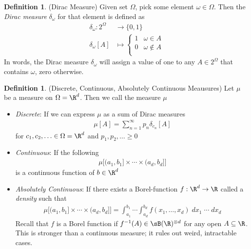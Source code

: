 \documentclass[12pt]{article}
\theoremstyle{plain}
\theoremstyle{definition}
\newtheorem{defn}[thm]{Definition}
\theoremstyle{remark}
\newcommand{\ra}{\rightarrow}
\newcommand{\ninf}{_{n=1}^\infty}
\begin{document}
\begin{defn}(Dirac Measure)
Given set $\Omega$, pick some element $\omega\in\Omega$. Then the
\emph{Dirac measure} $\delta_\omega$ for that element is defined as
\begin{align*}
  \delta_\omega: 2^\Omega &\ra \{0,1\} \\
  \delta_\omega[A]
  &\mapsto
  \begin{cases}
    1 & \omega\in A\\
    0 & \omega\not\in A\\
  \end{cases}
\end{align*}
In words, the Dirac measure $\delta_\omega$ will assign a value of one
to any $A\in2^\Omega$ that contains $\omega$, zero otherwise.
\end{defn}

\begin{defn}(Discrete, Continuous, Absolutely Continuous Meausures)
Let $\mu$ be a measure on $\Omega=\R^d$. Then we call the measure $\mu$
\begin{itemize}
  \item \emph{Discrete}: If we can express $\mu$ as a sum of Dirac
    measures
    \begin{align*}
      \mu[A] = \sum\ninf p_n \delta_{c_n}[A]
    \end{align*}
    for $c_1,c_2,\ldots\in\Omega=\R^d$ and $p_1,p_2,\ldots\geq 0$

  \item \emph{Continuous}: If the following
    \begin{align*}
      \mu\big[
        (a_1,b_1] \times\cdots\times (a_d,b_d]
      \big]
    \end{align*}
    is a continuous function of $b\in \R^d$

  \item \emph{Absolutely Continuous}: If there exists a Borel-function
    $f:\R^d\ra\R$ called a \emph{density} such that
    \begin{align*}
      \mu\big[
        (a_1,b_1] \times\cdots\times (a_d,b_d]
      \big]
      =
      \int_{a_1}^{b_1}
      \cdots
      \int_{a_d}^{b_d}
      f(x_1,\ldots,x_d)\;
      dx_1\;\cdots \;dx_d
    \end{align*}
    Recall that $f$ is a Borel function if
    $f^{-1}(A) \in \sB(\R)^{\otimes d}$ for any open $A\subseteq\R$.
    This is stronger than a continuous measure; it rules out weird,
    intractable cases.
\end{itemize}
\end{defn}
\end{document}
